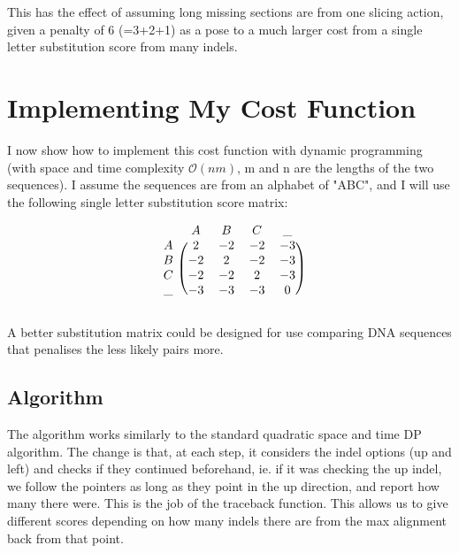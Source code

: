 \documentclass{mm2}
\begin{document}
This has the effect of assuming long missing sections are from one slicing action, given a penalty of 6 (=3+2+1) as a pose to a much larger cost from a single letter substitution score from many indels.



\newpage


\section{Implementing My Cost Function}
I now show how to implement this cost function with dynamic programming (with space and time complexity $\mathcal{O}(nm)$, m and n are the lengths of the two sequences). I assume the sequences are from an alphabet of "ABC", and I will use the following single letter substitution score matrix:


\[
\begin{blockarray}{ccccc}
& A & B & C & \_ \\
\begin{block}{c(cccc)}
  A &  2 & -2 & -2 & -3 \\
  B & -2 &  2 & -2 & -3 \\
  C & -2 & -2 &  2 & -3 \\
  \_& -3 & -3 & -3 &  0 \\
\end{block}
\end{blockarray}
 \]

A better substitution matrix could be designed for use comparing DNA sequences that penalises the less likely pairs more.

\subsection{Algorithm}

The algorithm works similarly to the standard quadratic space and time DP algorithm. The change is that, at each step, it considers the indel options (up and left) and checks if they continued beforehand, ie. if it was checking the up indel, we follow the pointers as long as they point in the up direction, and report how many there were. This is the job of the traceback function. This allows us to give different scores depending on how many indels there are from the max alignment back from that point.
\end{document}
